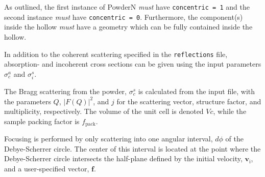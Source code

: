 As outlined, the first instance of PowderN \emph{must} have \texttt{concentric = 1} and the second instance \emph{must}
have \texttt{concentric = 0}. Furthermore, the component(s) inside the hollow \emph{must} have a geometry which can
be fully contained inside the hollow.


In addition to the coherent scattering specified in the \verb+reflections+ file, absorption- and incoherent 
cross sections can be given using the input parameters $\sigma_c^a$ and $\sigma_i^s$.


The Bragg scattering from the powder,
$\sigma_c^s$ is calculated from the input file, with the parameters
$Q$, $|F(Q)|^2$, and $j$ for the scattering vector, structure factor, and
multiplicity, respectively. The volume of the unit cell is denoted $Vc$,
while the sample packing factor is $f_\mathrm{pack}$.



Focusing is performed by only scattering into one angular
interval, $d\phi$ of the Debye-Scherrer circle. The center of this
interval is located at the point where the Debye-Scherrer circle
intersects the half-plane defined by the initial velocity, $\boldsymbol{v}_\mathrm{i}$,
and a user-specified vector, $\boldsymbol{f}$.

%

